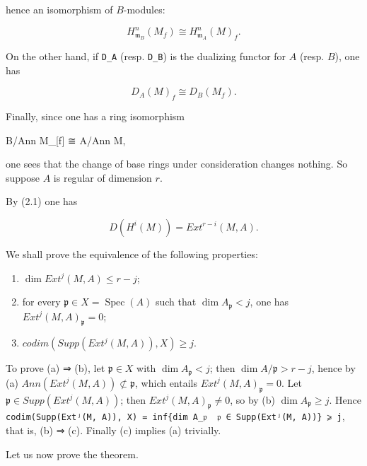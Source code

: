 \documentclass[
]{article}
\newenvironment{Shaded}{}{}
\newcommand{\NormalTok}[1]{#1}
\begin{document}
hence an isomorphism of \(B\)-modules:

\[
H^{n}_{\mathfrak{m}_{B}}(M_{f}) \cong H^{n}_{\mathfrak{m}_{A}}(M)_{f}.
\]

On the other hand, if \texttt{D\_A} (resp. \texttt{D\_B}) is the
dualizing functor for \(A\) (resp. \(B\)), one has

\[
D_{A}(M)_{f} \cong D_{B}(M_{f}).
\]

Finally, since one has a ring isomorphism

\begin{Shaded}
\begin{Highlighting}[]
\NormalTok{B/Ann M\_[f] ≅ A/Ann M,}
\end{Highlighting}
\end{Shaded}

one sees that the change of base rings under consideration changes
nothing. So suppose \(A\) is regular of dimension \(r\).

By (2.1) one has

\[
D(H^{i}(M)) = Ext^{r-i}(M, A).
\]

We shall prove the equivalence of the following properties:

\begin{enumerate}
\def\labelenumi{(\alph{enumi})}
\item
  \(\dim Ext^{j}(M, A) \leqslant r - j\);
\item
  for every \(\mathfrak{p} \in X = \operatorname{Spec}(A)\) such that
  \(\dim A_{\mathfrak{p}} < j\), one has
  \(Ext^{j}(M, A)_{\mathfrak{p}} = 0\);
\item
  \(codim(Supp(Ext^{j}(M, A)), X) \geqslant j\).
\end{enumerate}

To prove (a) ⇒ (b), let \(\mathfrak{p} \in X\) with
\(\dim A_{\mathfrak{p}} < j\); then \(\dim A/\mathfrak{p} > r - j\),
hence by (a) \(Ann(Ext^{j}(M, A)) \not\subset \mathfrak{p}\), which
entails \(Ext^{j}(M, A)_{\mathfrak{p}} = 0\). Let
\(\mathfrak{p} \in Supp(Ext^{j}(M, A))\); then
\(Ext^{j}(M, A)_{\mathfrak{p}} \neq 0\), so by (b)
\(\dim A_{\mathfrak{p}} \geqslant j\). Hence
\texttt{codim(Supp(Extʲ(M,\ A)),\ X)\ =\ inf\{dim\ A\_𝔭\ \textbar{}\ 𝔭\ ∈\ Supp(Extʲ(M,\ A))\}\ ⩾\ j},
that is, (b) ⇒ (c). Finally (c) implies (a) trivially.

Let us now prove the theorem.
\end{document}
